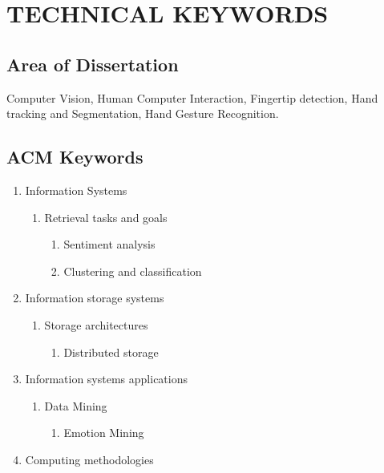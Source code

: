 \documentclass[oneside,a4paper,12pt]{pictreport}
\begin{document}
\chapter{TECHNICAL KEYWORDS}
\section{Area of Dissertation}
Computer Vision, Human Computer Interaction, Fingertip detection, Hand tracking and Segmentation, Hand Gesture Recognition.

\section{ACM Keywords}
\begin{enumerate}[label=\Alph*]
    \item Information Systems
    \begin{enumerate}[label*=.\arabic*]
        \item Retrieval tasks and goals
        \begin{enumerate}[label*=.\arabic*]
            \item Sentiment analysis
            \item Clustering and classification
        \end{enumerate}
    \end{enumerate}
    \item Information storage systems
        \begin{enumerate}[label*=.\arabic*]
            \item Storage architectures
            \begin{enumerate}[label*=.\arabic*]
                \item Distributed storage
            \end{enumerate} 
        \end{enumerate}
    \item Information systems applications 
        \begin{enumerate}[label*=.\arabic*]
            \item Data Mining
            \begin{enumerate}[label*=.\arabic*]
                \item Emotion Mining
            \end{enumerate}
        \end{enumerate}
    \item Computing methodologies
        \begin{enumerate}[label*=.\arabic*]

\end{enumerate}
\end{enumerate}
\end{document}
